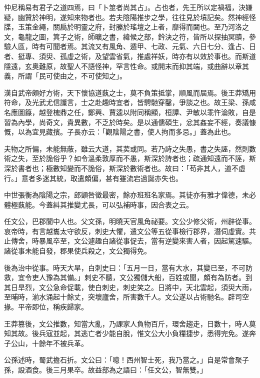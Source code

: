 
\begin{pinyinscope}
仲尼稱易有君子之道四焉，曰「卜筮者尚其占」。占也者，先王所以定禍福，決嫌疑，幽贊於神明，遂知來物者也。若夫陰陽推步之學，往往見於墳記矣。然神經怪牒，玉策金繩，關扃於明靈之府，封縢於瑤壇之上者，靡得而闚也。至乃河洛之文，龜龍之圖，箕子之術，師曠之書，緯候之部，鈐決之符，皆所以探抽冥賾，參驗人區，時有可聞者焉。其流又有風角、遁甲、七政、元氣、六日七分、逢占、日者、挺專、須臾、孤虛之術，及望雲省氣，推處祥妖，時亦有以效於事也。而斯道隱遠，玄奧難原，故聖人不語怪神，罕言性命。或開末而抑其端，或曲辭以章其義，所謂「民可使由之，不可使知之」。

漢自武帝頗好方術，天下懷協道蓺之士，莫不負策抵掌，順風而屆焉。後王莽矯用符命，及光武尤信讖言，士之赴趣時宜者，皆騁馳穿鑿，爭談之也。故王梁、孫咸名應圖籙，越登槐鼎之任，鄭興、賈逵以附同稱顯，桓譚、尹敏以乖忤淪敗，自是習為內學，尚奇文，貴異數，不乏於時矣。是以通儒碩生，忿其姦妄不經，奏議慷慨，以為宜見藏擯。子長亦云：「觀陰陽之書，使人拘而多忌。」蓋為此也。

夫物之所偏，未能無蔽，雖云大道，其荬或同。若乃詩之失愚，書之失誣，然則數術之失，至於詭俗乎？如令溫柔敦厚而不愚，斯深於詩者也；疏通知遠而不誣，斯深於書者也；極數知變而不詭俗，斯深於數術者也。故曰：「苟非其人，道不虛行。」意者多迷其統，取遣頗偏，甚有雖流宕過誕亦失也。

中世張衡為陰陽之宗，郎顗咎徵最密，餘亦班班名家焉。其徒亦有雅才偉德，未必體極蓺能。今蓋糾其推變尤長，可以弘補時事，因合表之云。

任文公，巴郡閬中人也。父文孫，明曉天官風角祕要。文公少修父術，州辟從事。哀帝時，有言越巂太守欲反，刺史大懼，遣文公等五從事檢行郡界，潛伺虛實。共止傳舍，時暴風卒至，文公遽趣白諸從事促去，當有逆變來害人者，因起駕速驅。諸從事未能自發，郡果使兵殺之，文公獨得免。

後為治中從事。時天大旱，白刺史曰：「五月一日，當有大水，其變已至，不可防救，宜令吏人豫為其備。」刺史不聽，文公獨儲大船，百姓或聞，頗有為防者。到其日旱烈，文公急命促載，使白刺史，刺史笑之。日將中，天北雲起，須臾大雨，至晡時，湔水涌起十餘丈，突壞廬舍，所害數千人。文公遂以占術馳名。辟司空掾。平帝即位，稱疾歸家。

王莽篡後，文公推數，知當大亂，乃課家人負物百斤，環舍趨走，日數十，時人莫知其故。後兵寇並起，其逃亡者少能自脫，惟文公大小負糧捷步，悉得完免。遂奔子公山，十餘年不被兵革。

公孫述時，蜀武擔石折。文公曰：「噫！西州智士死，我乃當之。」自是常會聚子孫，設酒食。後三月果卒。故益部為之語曰：「任文公，智無雙。」


\end{pinyinscope}
